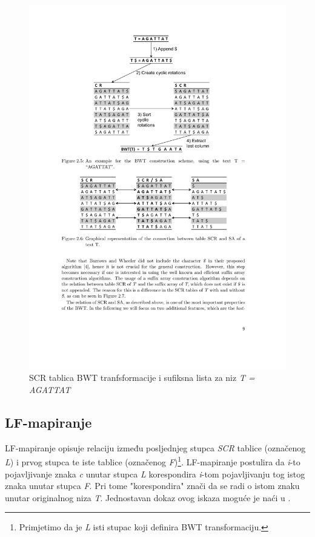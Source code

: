 \documentclass[times, utf8, seminar, numeric]{fer}
\begin{document}
\begin{figure}[!htb]
\centering
\includegraphics{fig/bwt_sa.pdf}
\caption{SCR tablica BWT tranfsformacije i sufiksna lista za niz \textit{T = AGATTAT}}
\label{fig:bwt_sa}
\end{figure}

\subsection{LF-mapiranje}

LF-mapiranje  opisuje relaciju između posljednjeg
stupca \textit{SCR} tablice (označenog \textit{L}) i prvog stupca te iste tablice (označenog
\textit{F})\footnote{Primjetimo da je \textit{L} isti stupac
koji definira BWT transformaciju.}. LF-mapiranje postulira da
\textit{i}-to pojavljivanje znaka \textit{c} unutar stupca \textit{L} korespondira
\textit{i}-tom pojavljivanju tog istog znaka unutar stupca \textit{F}. Pri tome "korespondira"
znači da se radi o istom znaku unutar originalnog niza \textit{T}. Jednostavan dokaz ovog
iskaza moguće je naći u \cite{singer_2012}.
\end{document}
